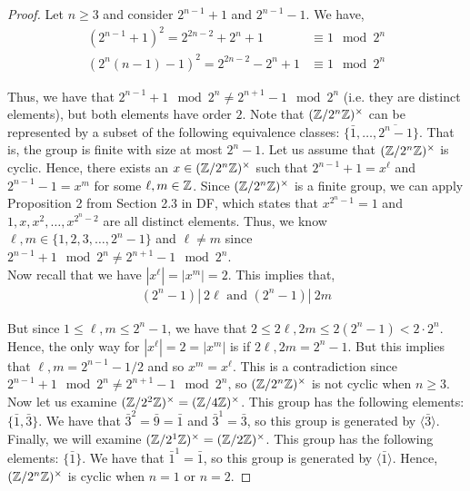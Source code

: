 \documentclass[11pt, reqno]{amsart}
\theoremstyle{plain}
\theoremstyle{definition}
\theoremstyle{example}
\begin{document}
\begin{proof}
Let $n \geq 3$ and consider $2^{n-1}+1$ and $2^{n-1}-1$. We have,
\begin{align*}
(2^{n-1}+1)^2 = 2^{2n-2} + 2^n + 1 &\equiv 1 \mod 2^n\\
(2^n(n-1)-1)^2 = 2^{2n-2} - 2^n + 1 &\equiv 1 \mod 2^n
\end{align*}

Thus, we have that $2^{n-1}+1 \mod 2^n \neq 2^{n+1}-1 \mod 2^n$ (i.e. they are distinct elements), but both elements have order $2$.  Note that $(\mathbb{Z}/2^n\mathbb{Z})^{\times}$ can be represented by a subset of the following equivalence classes: $\{\bar{1}, \ldots, \overline{2^n-1}\}$. That is, the group is finite with size at most $2^n-1$. Let us assume that $(\mathbb{Z}/2^n\mathbb{Z})^{\times}$ is cyclic. Hence, there exists an $x \in (\mathbb{Z}/2^n\mathbb{Z})^{\times}$ such that $2^{n-1}+1 = x^\ell$ and $2^{n-1}-1 = x^m$ for some $\ell, m \in \mathbb{Z}$. Since $(\mathbb{Z}/2^n\mathbb{Z})^{\times}$ is a finite group, we can apply Proposition 2 from Section 2.3 in DF, which states that $x^{2^n-1} = 1$ and $1, x, x^2, \ldots, x^{2^n-2}$ are all distinct elements. Thus, we know $\ell, m \in \{1, 2, 3, \ldots, 2^{n}-1\}$ and $\ell \neq m$ since $2^{n-1}+1 \mod 2^n \neq 2^{n+1}-1 \mod 2^n$.\\

Now recall that we have $|x^{\ell}| = |x^m| =  2$. This implies that,
\begin{align*}
(2^n - 1) |\ 2\ell \text{ and } (2^n - 1) |\ 2m
\end{align*}

But since $1 \leq \ell, m \leq 2^n - 1$, we have that $2 \leq 2\ell, 2m \leq 2(2^n -1) < 2 \cdot 2^n$. Hence, the only way for $|x^{\ell}| = 2 = |x^m|$ is if $2\ell, 2m = 2^{n}-1$. But this implies that $\ell, m = 2^{n-1} - 1/2$ and so $x^m = x^\ell$. This is a contradiction since $2^{n-1}+1 \mod 2^n \neq 2^{n+1}-1 \mod 2^n$, so $(\mathbb{Z}/2^n\mathbb{Z})^{\times}$ is not cyclic when $n \geq 3$.\\

Now let us examine $(\mathbb{Z}/2^2\mathbb{Z})^{\times} = (\mathbb{Z}/4\mathbb{Z})^{\times}$. This group has the following elements: $\{\bar{1}, \bar{3}\}$. We have that $\bar{3}^2 = \bar{9} = \bar{1}$ and $\bar{3}^1 = \bar{3}$, so this group is generated by $\langle \bar{3} \rangle$.\\

Finally, we will examine $(\mathbb{Z}/2^1\mathbb{Z})^{\times} = (\mathbb{Z}/2\mathbb{Z})^{\times}$. This group has the following elements: $\{\bar{1}\}$. We have that $\bar{1}^1 = \bar{1}$, so this group is generated by $\langle \bar{1} \rangle$. Hence, $(\mathbb{Z}/2^n\mathbb{Z})^\times$ is cyclic when $n = 1$ or $n = 2$.
\end{proof}
\end{document}
